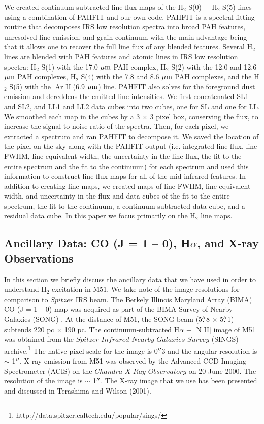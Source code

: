 \documentclass[manuscript]{aastex}
\begin{document}
We created continuum-subtracted line flux maps of the H$_2$
S(0) $-$ H$_2$ S(5) lines using a combination of PAHFIT
\citep{smi07} and our own code.  PAHFIT is a spectral fitting routine
that decomposes IRS low resolution spectra into broad 
PAH features, unresolved line emission, and grain continuum with the main advantage
being that it allows one to recover the full line flux of any blended
features.  Several H$_2$ lines are blended with PAH features and atomic 
lines in IRS low resolution spectra:
H$_2$ S(1) with the 17.0 $\mbox{$\mu$m}$ PAH complex,
H$_2$ S(2) with the 12.0 and 12.6 $\mbox{$\mu$m}$ PAH complexes, 
H$_2$ S(4) with the 7.8 and 8.6 $\mbox{$\mu$m}$ PAH complexes, and the
H$_2$ S(5) with the [Ar II](6.9 $\mbox{$\mu$m}$) line.  
PAHFIT also solves for the foreground dust emission and 
dereddens the emitted line intensities.  We first
concatenated SL1 and SL2, and LL1 and LL2 data cubes into two cubes,
one for SL and one for LL.  We smoothed each map in the cubes by a 3
$\times$ 3 pixel box, conserving the flux, to increase the
signal-to-noise ratio of the spectra.  Then, for each pixel, we
extracted a spectrum and ran PAHFIT to decompose it.  We saved the
location of the pixel on the sky along with the PAHFIT output 
(i.e. integrated line flux, line FWHM, line equivalent width, the 
uncertainty in the line flux, the fit to the entire spectrum and 
the fit to the continuum) for each spectrum and used this 
information to construct line flux maps for all of the mid-infrared 
features.  In addition to creating line maps, we created maps 
of line FWHM, line equivalent width, and uncertainty in the 
flux and data cubes of the fit to the entire spectrum, the fit to 
the continuum, a continuum-subtracted data cube, and a 
residual data cube.  In this paper we focus primarily on the 
H$_2$ line maps.

\subsection{Ancillary Data: CO (J = 1 -- 0), H$\alpha$, and X-ray Observations}

In this section we briefly discuss the ancillary data that we 
have used in order to understand H$_2$ excitation in M51.  
We take note of the image resolutions for comparison to 
$Spitzer$ IRS beam.  The Berkely Illinois Maryland Array (BIMA) CO (J = 1 -- 0) map was
acquired as part of the BIMA Survey of Nearby Galaxies (SONG)
\citep{reg01, hel03}.  At the distance of M51, the SONG beam
(5$\mbox{$.\!\!^{\prime\prime}$}$8 $\times$ 5$\mbox{$.\!\!^{\prime\prime}$}$1) subtends 220 pc $\times$ 190 pc.  
The continuum-subtracted H$\alpha$ + [N II] image of M51 was obtained from the
$Spitzer$ $Infrared$ $Nearby$ $Galaxies$ $Survey$ (SINGS) archive.\footnote{http://data.spitzer.caltech.edu/popular/sings/} 
The native pixel scale for the image is 0$\mbox{$.\!\!^{\prime\prime}$}$3 
and the angular resolution is $\sim$ 1$\mbox{$^{\prime\prime}$}$.  X-ray 
emission from M51 was observed by the Advanced CCD 
Imaging Spectrometer (ACIS) on the $Chandra$ $X$-$Ray$ 
$Observatory$ on 20 June 2000.  The resolution of 
the image is $\sim$ 1$\mbox{$^{\prime\prime}$}$.  The X-ray image that 
we use has been presented and discussed in 
Terashima and Wilson (2001).
\end{document}
